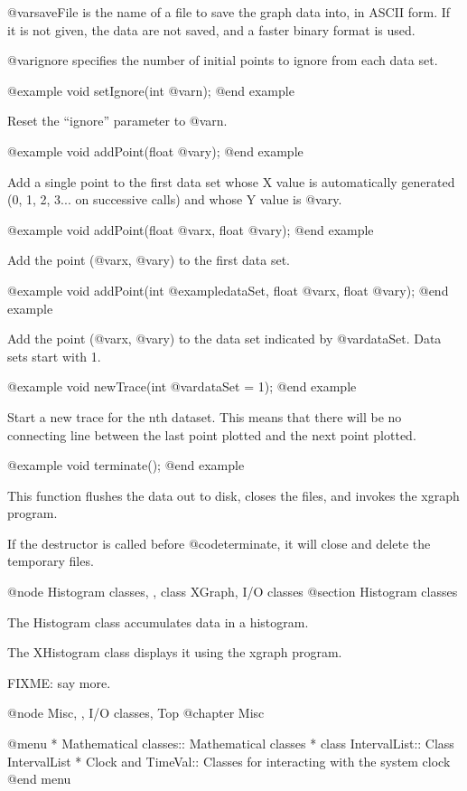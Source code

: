 @var{saveFile} is the name of a file to save the graph data into, in
ASCII form.  If it is not given, the data are not saved, and a faster
binary format is used.

@var{ignore} specifies the number of initial points to ignore from
each data set.

@example
void setIgnore(int @var{n});
@end example

Reset the ``ignore'' parameter to @var{n}.

@example
void addPoint(float @var{y});
@end example

Add a single point to the first data set whose X value is
automatically generated (0, 1, 2, 3... on successive calls)
and whose Y value is @var{y}.

@example
void addPoint(float @var{x}, float @var{y});
@end example

Add the point (@var{x}, @var{y}) to the first data set.

@example
void addPoint(int @example{dataSet}, float @var{x}, float @var{y});
@end example

Add the point (@var{x}, @var{y}) to the data set indicated by
@var{dataSet}.  Data sets start with 1.

@example
void newTrace(int @var{dataSet} = 1);
@end example

Start a new trace for the nth dataset.  This means that there will be
no connecting line between the last point plotted and the next point
plotted.

@example
void terminate();
@end example

This function flushes the data out to disk, closes the files, and
invokes the xgraph program.

If the destructor is called before @code{terminate}, it will close and
delete the temporary files.

@node Histogram classes,  , class XGraph, I/O classes
@section Histogram classes

The Histogram class accumulates data in a histogram.

The XHistogram class displays it using the xgraph program.

FIXME: say more.

@node Misc,  , I/O classes, Top
@chapter Misc

@menu
* Mathematical classes::        Mathematical classes
* class IntervalList::          Class IntervalList
* Clock and TimeVal::           Classes for interacting with the system clock
@end menu

